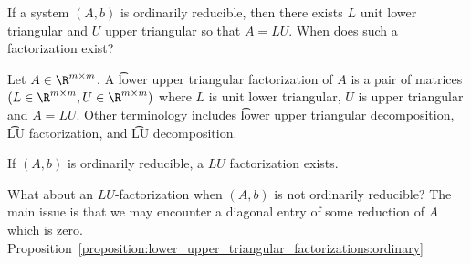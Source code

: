 

If a system $(A, b)$ is ordinarily reducible, then there exists $L$ unit lower triangular and $U$ upper triangular so that $A = LU$.
When does such a factorization exist?


Let $A \in \R^{m \times m}$.
A \t{lower upper triangular factorization} of $A$ is a pair of matrices $(L \in \R^{m \times m}, U \in \R^{m \times m})$ where $L$ is unit lower triangular, $U$ is upper triangular and $A = LU$.
Other terminology includes \t{lower upper triangular decomposition}, \t{LU factorization}, and \t{LU decomposition}.

\begin{proposition}
  If $(A, b)$ is ordinarily reducible, a $LU$ factorization exists.
  \label{proposition:lower_upper_triangular_factorizations:ordinary}
\end{proposition}

What about an $LU$-factorization when $(A, b)$ is not ordinarily reducible?
The main issue is that we may encounter a diagonal entry of some reduction of $A$ which is zero.
Proposition~\ref{proposition:lower_upper_triangular_factorizations:ordinary}




%
%
%


\blankpage
